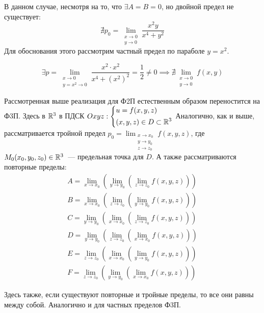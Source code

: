\documentclass[../../main.tex]{subfiles}
\begin{document}
\begin{exmps}
\begin{itemize}
	В данном случае, несмотря на то, что $\exists A = B = 0$, но
	двойной предел не существует:
	\[\nexists p_0 = 
	\lim_{\substack{x \to 0 \\ y \to 0}}{\dfrac{x^2 y}{x^4 + y^2}}\]	
	Для обоснования этого рассмотрим частный предел по параболе
	$y = x^2$.
	
	\[\exists p = \lim_{\substack{x \to 0 \\ y = x^2 \to 0}}
	{\dfrac{x^2 \cdot x^2}{x^4 + (x^2)^2}} = \dfrac{1}{2} \ne 0
	\implies \nexists \lim_{\substack{x \to 0 \\ y \to 0}}{f(x, y)}\]
\end{itemize}
\end{exmps}

Рассмотренная выше реализация для Ф2П естественным образом
переностится на Ф3П. Здесь в $\mathbb{R}^3$ в ПДСК $Oxyz:
\left\{\begin{aligned}
	&u = f(x, y, z) \\
	&(x, y, z) \in D \subset \mathbb{R}^3	\end{aligned}\right.$
	Аналогично, как и выше, рассматривается тройной предел
	$p_0 = \displaystyle \lim_{\substack{x \to x_0 \\ y \to y_0 \\ z \to z_0}}
{f(x, y, z)}$, где $M_0(x_0, y_0, z_0) \in \mathbb{R}^3$~--- предельная точка для $D$.
А также рассматриваются повторные пределы:
\begin{gather*}
	A = \lim_{x \to x_0}{(\lim_{y \to y_0}{(\lim_{z \to z_0}{f(x, y, z)})})} \\
	B = \lim_{x \to x_0}{(\lim_{z \to z_0}{(\lim_{y \to y_0}{f(x, y, z)})})} \\
	C = \lim_{y \to y_0}{(\lim_{x \to x_0}{(\lim_{z \to z_0}{f(x, y, z)})})} \\
	D = \lim_{y \to y_0}{(\lim_{z \to z_0}{(\lim_{x \to x_0}{f(x, y, z)})})} \\
	E = \lim_{z \to z_0}{(\lim_{x \to x_0}{(\lim_{y \to y_0}{f(x, y, z)})})} \\
	F = \lim_{z \to z_0}{(\lim_{y \to y_0}{(\lim_{x \to x_0}{f(x, y, z)})})}
\end{gather*}
	
Здесь также, если существуют повторные и тройные
пределы, то все они равны между собой. Аналогично и для
частных пределов Ф3П.
	
\end{document}
